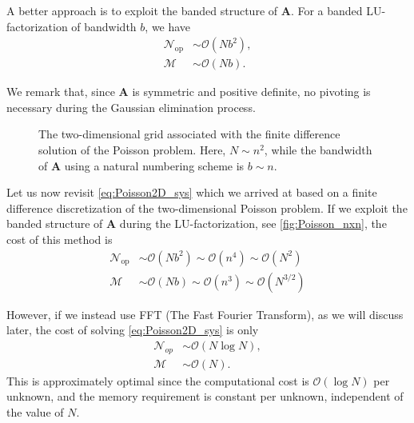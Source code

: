 A better approach is to exploit the banded structure of $\bm A$. For a banded
LU-factorization of bandwidth $b$, we have
\begin{align*}
  \mathcal{N}_\text{op} &\sim \mathcal{O}(N b^2) ,\\
  \mathcal{M} &\sim \mathcal{O}(N b) .
\end{align*}

We remark that, since $\bm A$ is symmetric and positive definite, no pivoting is
necessary during the Gaussian elimination process.

\begin{figure}
  \centering
  \caption{
    The two-dimensional grid associated with the finite difference solution of
    the Poisson problem. Here, $N \sim n^2$, while the bandwidth of
    $\bm A$ using a natural numbering scheme is $b\sim n$.
  }
  \label{fig:Poisson_nxn}
\end{figure}

Let us now revisit \eqref{eq:Poisson2D_sys} which we arrived at based on a
finite difference discretization of the two-dimensional Poisson problem. If we
exploit the banded structure of $\bm A$ during the LU-factorization, see
\autoref{fig:Poisson_nxn}, the cost of this method is
\begin{align*}
  \mathcal{N}_\text{op} &\sim \mathcal{O}(N b^2)
                          \sim \mathcal{O}(n^4) \sim \mathcal{O}(N^2)\\
  \mathcal{M} &\sim \mathcal{O}(N b) \sim \mathcal{O}(n^3) \sim \mathcal{O}(N^{3/2})
\end{align*}

However, if we instead use FFT (The Fast Fourier Transform), as we will discuss
later, the cost of solving \eqref{eq:Poisson2D_sys} is only
\begin{align*}
  \mathcal{N}_{op} &\sim \mathcal{O}(N \log N), \\
  \mathcal{M} &\sim \mathcal{O}(N).
\end{align*}
This is approximately optimal since the computational cost is $\mathcal{O}(\log
N)$ per unknown, and the memory requirement is constant per unknown, independent
of the value of $N$.

